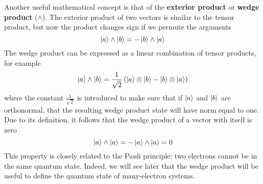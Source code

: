 \documentclass[../Main/chem532-notes.tex]{subfiles}
\begin{document}
Another useful mathematical concept is that of the \textbf{exterior product} or \textbf{wedge product} ($\wedge$).
The exterior product of two vectors is similar to the tensor product, but now the product changes sign if we permute the arguments
\begin{equation}
\ket{a} \wedge  \ket{b} = - \ket{b} \wedge  \ket{a} 
\end{equation}
The wedge product can be expressed as a linear combination of tensor products, for example
\begin{equation}
\ket{a} \wedge  \ket{b} =  \frac{1}{\sqrt{2}} \left( \ket{a} \otimes  \ket{b}  - \ket{b} \otimes  \ket{a}  \right)
\end{equation}
where the constant $\frac{1}{\sqrt{2}}$ is introduced to make sure that if $\ket{a}$ and $\ket{b}$ are orthonormal, that the resulting wedge product state will have norm equal to one.
Due to its definition, it follows that the wedge product of a vector with itself is zero
\begin{equation}
\ket{a} \wedge  \ket{a} = - \ket{a} \wedge  \ket{a} = 0
\end{equation}
This property is closely related to the Pauli principle: two electrons cannot be in the same quantum state. Indeed, we will see later that the wedge product will be useful to define the quantum state of many-electron systems.

\end{document}
